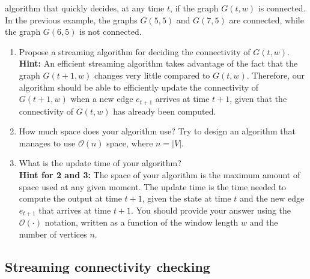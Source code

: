 algorithm that quickly decides, at any time $t$, if the graph $G(t,w)$ is connected. In the previous example, the graphs $G(5,5)$ and $G(7,5)$ are connected, while the graph $G(6,5)$ is not connected.
\begin{enumerate}
	\item Propose a streaming algorithm for deciding the connectivity of $G(t,w)$.\\
	\textbf{Hint:} An efficient streaming algorithm takes advantage of the fact that the graph $G(t+1,w)$ changes very little compared to $G(t,w)$. Therefore, our algorithm should be able to efficiently update the connectivity of $G(t + 1,w)$ when a new edge $e_{t+1}$ arrives at time $t + 1$, given that the connectivity of $G(t,w)$ has already been computed.
	\item How much space does your algorithm use? Try to design an algorithm that manages to use
	$\mathcal{O}(n)$ space, where $n = |V|$.
	\item What is the update time of your algorithm?\\
	\textbf{Hint for 2 and 3:} The space of your algorithm is the maximum amount of space used at
	any given moment. The update time is the time needed to compute the output at time $t+1$,
	given the state at time $t$ and the new edge $e_{t+1}$ that arrives at time $t + 1$. You should provide your answer using the $\mathcal{O}(\cdot)$ notation, written as a function of the window length $w$ and the number of vertices $n$.
\end{enumerate}

\subsection{Streaming connectivity checking}

